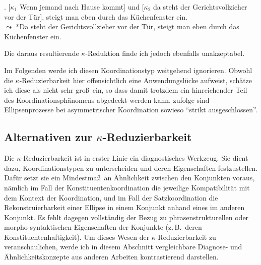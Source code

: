 \ex. \label{ex-ak-1} [$\kappa_1$ Wenn jemand nach Hause kommt] und [$\kappa_2$ da steht der Gerichtsvollzieher vor der Tür], steigt man eben durch das Küchenfenster ein. \\
$\leadsto$ *Da steht der Gerichtsvollzieher vor der Tür, steigt man eben durch das Küchenfenster ein.

Die daraus resultierende $\kappa$-Reduktion finde ich jedoch ebenfalls unakzeptabel.

Im Folgenden werde ich diesen Koordinationstyp weitgehend ignorieren. Obwohl die $\kappa$-Reduzierbarkeit hier offensichtlich eine Anwendungslücke aufweist, schätze ich diese als nicht sehr gro\ss\ ein, so dass damit trotzdem ein hinreichender Teil des Koordinationsphänomens abgedeckt werden kann. \citet[(173)]{Reich:09} zufolge sind Ellipsenprozesse bei asymmetrischer Koordination sowieso "`strikt ausgeschlossen"'.

\subsection{Alternativen zur $\kappa$-Reduzierbarkeit} \label{sec-koordinationsellipsen-5}

Die $\kappa$-Reduzierbarkeit ist in erster Linie ein diagnostisches Werkzeug. Sie dient dazu, Koordinationstypen zu unterscheiden und deren Eigenschaften festzustellen. Dafür setzt sie ein Mindestma\ss\ an Ähnlichkeit zwischen den Konjunkten voraus, nämlich im Fall der Konstituentenkoordination die jeweilige Kompatibilität mit dem Kontext der Koordination, und im Fall der Satzkoordination die Rekonstruierbarkeit einer  Ellipse in einem Konjunkt anhand eines  im anderen Konjunkt. Es fehlt dagegen vollständig der Bezug zu phrasenstrukturellen oder morpho-syntaktischen Eigenschaften der Konjunkte (z.\,B.\  deren Konstituentenhaftigkeit).  
Um dieses Wesen der $\kappa$-Reduzierbarkeit zu veranschaulichen, werde ich in diesem Abschnitt vergleichbare Diagnose- und Ähnlichkeitskonzepte aus anderen Arbeiten kontrastierend darstellen. 

